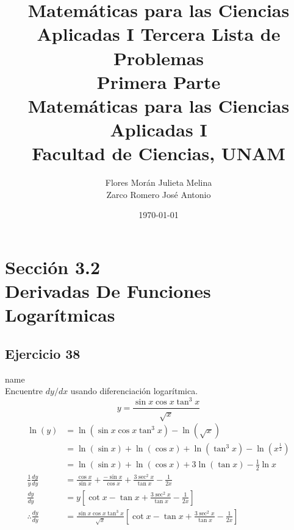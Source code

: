 \documentclass[12pt]{article}
\title{Matemáticas para las Ciencias Aplicadas I}
\title{
	Tercera Lista de Problemas \\
	\textbf{Primera  Parte} \\
	\vspace{1ex}
	\large Matemáticas para las Ciencias Aplicadas I \\
	Facultad de Ciencias, UNAM}
\date{\today}
\author{Flores Morán Julieta Melina \\ Zarco Romero José Antonio}
\begin{document}
\maketitle


\section{Sección 3.2 \\ Derivadas De Funciones Logarítmicas}
\subsection{Ejercicio 38} name \\

Encuentre $dy/dx$ usando diferenciación logarítmica.
\[
y=\frac{\sin{x}\cos{x}\tan^3{x}}{\sqrt{x}}
\]
\begin{equation*}
  \begin{split}
  \ln(y)
  &= \ln(\sin{x}\cos{x}\tan^3{x})-\ln(\sqrt{x}) \\
  &= \ln(\sin{x})+\ln(\cos{x})+\ln(\tan^3{x})-\ln \left(x^{\frac{1}{2}}\right) \\
  &= \ln(\sin{x})+\ln(\cos{x})+3\ln(\tan{x})-\frac{1}{2}\ln x \\
  \frac{1}{y}\frac{dy}{dy}
  &= \frac{\cos{x}}{\sin{x}} + \frac{-\sin{x}}{\cos{x}} + \frac{3\sec^2{x}}{\tan{x}} - \frac{1}{2x} \\
  \frac{dy}{dy}
  &= y \left[ \cot{x}-\tan{x} + \frac{3\sec^2{x}}{\tan{x}} - \frac{1}{2x} \right] \\
  \therefore \frac{dy}{dy}
  &= \frac{\sin{x}\cos{x}\tan^3{x}}{\sqrt{x}}
  \left[ \cot{x}-\tan{x} + \frac{3\sec^2{x}}{\tan{x}} - \frac{1}{2x} \right] \\
  \end{split}
\end{equation*}

\end{document}
